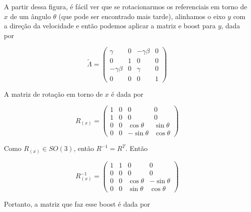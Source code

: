 \documentclass[10pt,a4paper]{article}
\begin{document}
\begin{enumerate}
	A partir dessa figura, é fácil ver que se rotacionarmos os referenciais em torno de $x$ de um ângulo $\theta$ (que pode ser encontrado mais tarde), alinhamos o eixo $y$ com a direção da velocidade e então podemos aplicar a matriz e boost para $y$, dada por 
	
\begin{equation} 
\tilde{\Lambda}=\begin{pmatrix}
\gamma & 0 & -\gamma \beta & 0 \\ 
0 & 1 & 0 & 0 \\ 
-\gamma \beta & 0 & \gamma & 0 \\ 
0 & 0 & 0 & 1
\end{pmatrix} 
\end{equation}

A matriz de rotação em torno de $x$ é dada por 

\begin{equation}
R_{(x)}=\begin{pmatrix}
1 & 0 & 0 & 0 \\ 
1 & 0 & 0 & 0 \\ 
0 & 0 & \cos\theta & \sin\theta \\ 
0 & 0 & -\sin\theta & \cos\theta
\end{pmatrix} 
\end{equation}

Como $R_{(x)} \in SO(3)$, então $R^{-1} = R^T$. Então

\begin{equation}
R_{(x)}^{-1}=\begin{pmatrix}
1 & 1 & 0 & 0 \\ 
0 & 0 & 0 & 0 \\ 
0 & 0 & \cos\theta & -\sin\theta \\ 
0 & 0 & \sin\theta & \cos\theta
\end{pmatrix} 
\end{equation}

Portanto, a matriz que faz esse boost é dada por 


\end{enumerate}
\end{document}
